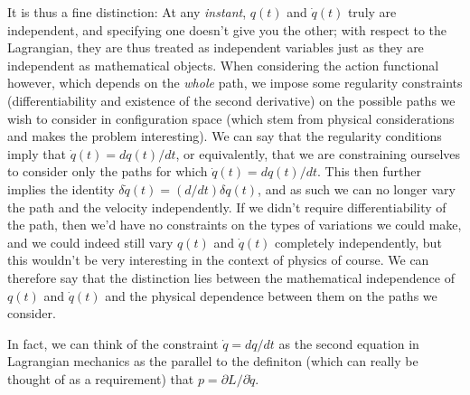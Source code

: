 \documentclass[a4paper]{article}
\begin{document}
    It is thus a fine distinction: At any \textit{instant}, \(q(t)\) and \(\dot{q}(t)\) truly are independent, and specifying one doesn't give you the other; with respect to the Lagrangian, they are thus treated as independent variables just as they are independent as mathematical objects. When considering the action functional however, which depends on the \textit{whole} path, we impose some regularity constraints (differentiability and existence of the second derivative) on the possible paths we wish to consider in configuration space (which stem from physical considerations and makes the problem interesting). We can say that the regularity conditions imply that \(\dot{q}(t) = dq(t) / dt\), or equivalently, that we are constraining ourselves to consider only the paths for which \(\dot{q} (t) = dq(t) / dt\). This then further implies the identity \(\delta \dot{q} (t) = (d / dt)\delta q(t)\), and as such we can no longer vary the path and the velocity independently. If we didn't require differentiability of the path, then we'd have no constraints on the types of variations we could make, and we could indeed still vary \(q(t)\) and \(\dot{q} (t)\) completely independently, but this wouldn't be very interesting in the context of physics of course. We can therefore say that the distinction lies between the mathematical independence of \(q(t)\) and \(\dot{q} (t)\) and the physical dependence between them on the paths we consider.   

    In fact, we can think of the constraint \(\dot{q} = dq/ dt\) as the second equation in Lagrangian mechanics as the parallel to the definiton (which can really be thought of as a requirement) that \(p = \partial L / \partial \dot{q}\).
\end{document}
